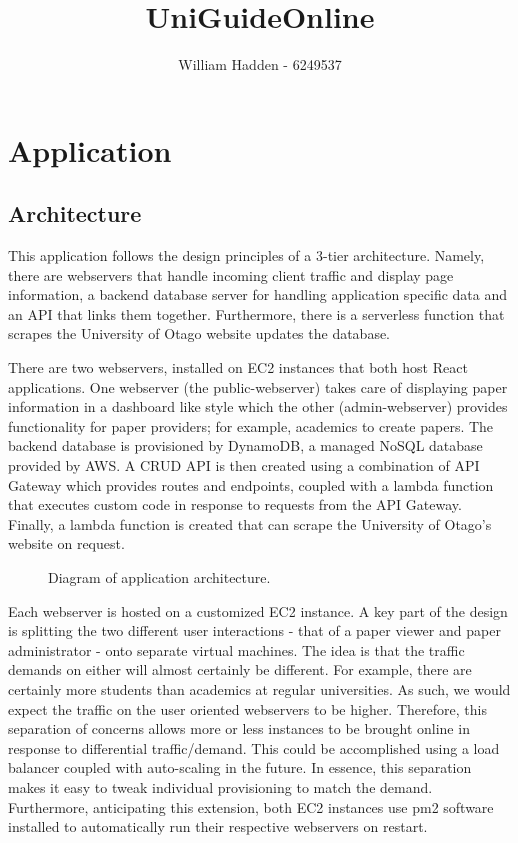 \documentclass[12pt]{article}
\begin{document}
\title{UniGuideOnline \\ }

\author{William Hadden - 6249537} 

\maketitle

\section{Application}
\subsection{Architecture}

This application follows the design principles of a 3-tier architecture. Namely, there are webservers that handle incoming client traffic and display page information, a backend database server for handling application specific data and an API that links them together. Furthermore, there is a serverless function that scrapes the University of Otago website updates the database.

There are two webservers, installed on EC2 instances that both host React applications. One webserver (the public-webserver) takes care of displaying paper information in a dashboard like style which the other (admin-webserver) provides functionality for paper providers; for example, academics to create papers. The backend database is provisioned by DynamoDB, a managed NoSQL database provided by AWS. A CRUD API is then created using a combination of API Gateway which provides routes and endpoints, coupled with a lambda function that executes custom code in response to requests from the API Gateway. Finally, a lambda function is created that can scrape the University of Otago's website on request.

\begin{figure}
    \caption{Diagram of application architecture.}
    \label{fig: application_architecutre}
\end{figure}

Each webserver is hosted on a customized EC2 instance. A key part of the design is splitting the two different user interactions - that of a paper viewer and paper administrator - onto separate virtual machines. The idea is that the traffic demands on either will almost certainly be different. For example, there are certainly more students than academics at regular universities. As such, we would expect the traffic on the user oriented webservers to be higher. Therefore, this separation of concerns allows more or less instances to be brought online in response to differential traffic/demand. This could be accomplished using a load balancer coupled with auto-scaling in the future. In essence, this separation makes it easy to tweak individual provisioning to match the demand. 
Furthermore, anticipating this extension, both EC2 instances use pm2 software installed to automatically run their respective webservers on restart. 
\end{document}
